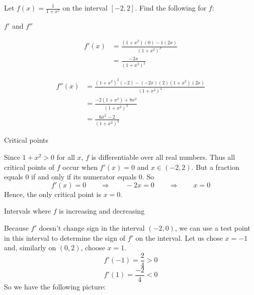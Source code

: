 \documentclass[handout,nooutcomes]{ximera}
\renewenvironment{freeResponse}{
\ifhandout\setbox0\vbox\bgroup\else
\begin{trivlist}\item[\hskip \labelsep\bfseries Solution:\hspace{2ex}]
\fi}
{\ifhandout\egroup\else
\end{trivlist}
\fi}
\begin{document}
\begin{problem}
Let $f(x) = \frac{1}{1 + x^2}$ on the interval $[-2,2]$.  Find the following for $f$:

	\begin{enumerate}
	
	\item  $f'$ and $f''$
	
		\begin{freeResponse}
			\begin{align*}
			f'(x) &= \frac{(1+x^2)(0) - 1(2x)}{(1+x^2)^2} \\
			&= \frac{-2x}{(1+x^2)^2}
			\end{align*}
			
			\begin{align*}
			f''(x) &= \frac{(1+x^2)^2(-2) - (-2x)(2)(1+x^2)(2x)}{(1+x^2)^4} \\
			&= \frac{-2(1+x^2) + 8x^2}{(1+x^2)^3} \\
			&= \frac{6x^2 - 2}{(1+x^2)^3}
			\end{align*}
		\end{freeResponse}
		
	\item  Critical points
	
		\begin{freeResponse}
		Since $1+x^2 > 0$ for all $x$, $f$ is differentiable over all real numbers.  Thus all critical points of $f$ occur when $f'(x) = 0$ and $x \in (-2,2)$.  But a fraction equals 0 if and only if its numerator equals 0.  So
		$$ f'(x) = 0 \qquad \Longrightarrow \qquad -2x = 0 \qquad \Longrightarrow \qquad x=0 $$
		Hence, the only critical point is $x=0$.  
		\end{freeResponse}
		
	\item  Intervals where $f$ is increasing and decreasing
	
		\begin{freeResponse}
		Because $f'$ doesn’t change sign in the interval $(-2,0)$, we can use a test point in this interval to determine the sign of $f'$ on the interval.  Let us chose $x=-1$ and, similarly on $(0,2)$, choose $x=1$.
		$$ f'(-1) = \frac{2}{4} > 0 $$
		$$ f'(1) = \frac{-2}{4} < 0 $$
		So we have the following picture:
		
		
\begin{center}
\begin{image}
\begin{tikzpicture}


\end{tikzpicture}
\end{image}
\end{center}
\end{freeResponse}
\end{enumerate}
\end{problem}
\end{document}
